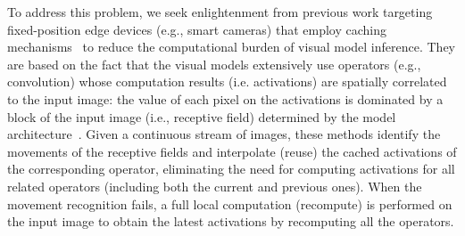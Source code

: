 To address this problem, we seek enlightenment from previous work targeting fixed-position edge devices (e.g., smart cameras) that employ caching mechanisms~\cite{cavigelli_cbinfer_2017,buckler_eva_2018,huynh_deepmon_2017} to reduce the computational burden of visual model inference.
They are based on the fact that the visual models extensively use operators (e.g., convolution) whose computation results (i.e. activations) are spatially correlated to the input image: the value of each pixel on the activations is dominated by a block of the input image (i.e., receptive field) determined by the model architecture~\cite{buckler_eva_2018}.
Given a continuous stream of images, these methods identify the movements of the receptive fields and interpolate (reuse) the cached activations of the corresponding operator, eliminating the need for computing activations for all related operators (including both the current and previous ones). 
When the movement recognition fails, a full local computation (recompute) is performed on the input image to obtain the latest activations by recomputing all the operators.

